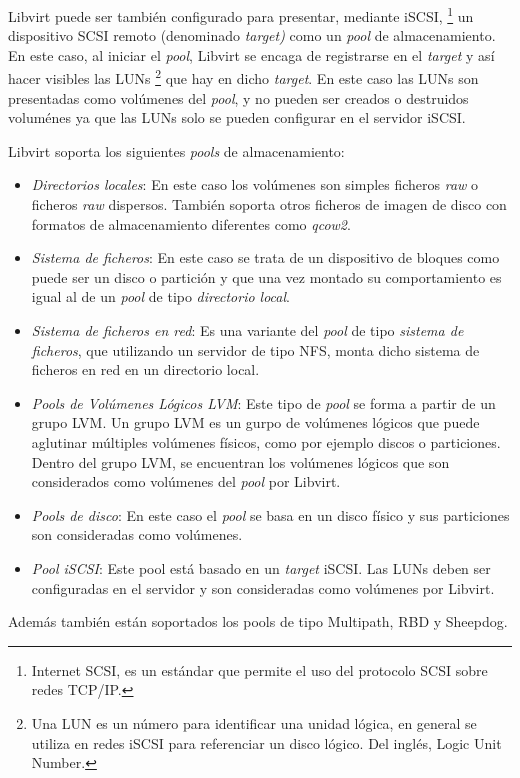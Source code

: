\documentclass[spanisheDIVcalc,twoside,parskip-,pointlessnumbers,final]{scrbook}
\begin{document}
Libvirt puede ser también configurado para presentar, mediante iSCSI,%
\footnote{Internet SCSI, es un estándar que permite el uso del protocolo SCSI
sobre redes TCP/IP.%
} un dispositivo SCSI remoto (denominado \emph{target)} como un \emph{pool}
de almacenamiento. En este caso, al iniciar el \emph{pool}, Libvirt
se encaga de registrarse en el \emph{target} y así hacer visibles
las LUNs%
\footnote{Una LUN es un número para identificar una unidad lógica, en general
se utiliza en redes iSCSI para referenciar un disco lógico. Del inglés,
Logic Unit Number.%
} que hay en dicho \emph{target}. En este caso las LUNs son presentadas
como volúmenes del \emph{pool}, y no pueden ser creados o destruidos
voluménes ya que las LUNs solo se pueden configurar en el servidor
iSCSI.

Libvirt soporta los siguientes \emph{pools} de almacenamiento: 
\begin{itemize}
\item \emph{Directorios locales}: En este caso los volúmenes son simples
ficheros \emph{raw} o ficheros \emph{raw} dispersos. También soporta
otros ficheros de imagen de disco con formatos de almacenamiento diferentes
como \emph{qcow2}.
\item \emph{Sistema de ficheros}: En este caso se trata de un dispositivo
de bloques como puede ser un disco o partición y que una vez montado
su comportamiento es igual al de un \emph{pool} de tipo \emph{directorio
local}.
\item \emph{Sistema de ficheros en red}: Es una variante del \emph{pool}
de tipo \emph{sistema de ficheros}, que utilizando un servidor de
tipo NFS, monta dicho sistema de ficheros en red en un directorio
local.
\item \emph{Pools de Volúmenes Lógicos LVM}: Este tipo de \emph{pool} se
forma a partir de un grupo LVM. Un grupo LVM es un gurpo de volúmenes lógicos
que puede aglutinar múltiples volúmenes físicos, como por ejemplo
discos o particiones. Dentro del grupo LVM, se encuentran los volúmenes
lógicos que son considerados como volúmenes del \emph{pool }por Libvirt.
\item \emph{Pools de disco}: En este caso el \emph{pool} se basa en un disco
físico y sus particiones son consideradas como volúmenes.
\item \emph{Pool iSCSI}: Este pool está basado en un \emph{target }iSCSI.
Las LUNs deben ser configuradas en el servidor y son consideradas
como volúmenes por Libvirt.
\end{itemize}
Además también están soportados los pools de tipo Multipath, RBD y
Sheepdog.
\end{document}
